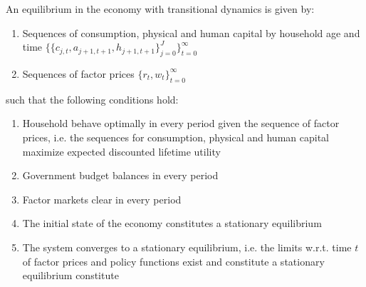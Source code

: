 An equilibrium in the economy with transitional dynamics is given by:
\begin{enumerate}
    \item Sequences of consumption, physical and human capital by household age and time $\{ \{c_{j, t}, a_{j+1, t+1}, h_{j+1, t+1} \}_{j=0}^{J} \}_{t=0}^{\infty}$
    \item Sequences of factor prices $\{r_t, w_t \}_{t=0}^{\infty}$
\end{enumerate}
such that the following conditions hold:
\begin{enumerate}
    \item Household behave optimally in every period given the sequence of factor prices, i.e. the sequences for consumption, physical and human capital maximize expected discounted lifetime utility
    \item Government budget balances in every period
    \item Factor markets clear in every period
    \item The initial state of the economy constitutes a stationary equilibrium
    \item The system converges to a stationary equilibrium, i.e. the limits w.r.t. time $t$ of factor prices and policy functions exist and constitute a stationary equilibrium
        constitute
\end{enumerate}

